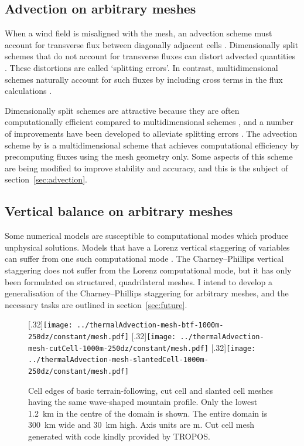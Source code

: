 \documentclass[a4paper,11pt]{article}
\begin{document}
\subsection*{Advection on arbitrary meshes}
When a wind field is misaligned with the mesh, an advection scheme must account for transverse flux between diagonally adjacent cells \citep{clappier1998}.  Dimensionally split schemes that do not account for transverse fluxes can distort advected quantities \citep{leonard1993}.  These distortions are called `splitting errors'.  In contrast, multidimensional schemes naturally account for such fluxes by including cross terms in the flux calculations \citep{leonard1993}.

Dimensionally split schemes are attractive because they are often computationally efficient compared to multidimensional schemes \citep{bott2010}, and a number of improvements have been developed to alleviate splitting errors \citep{leonard1996,bott2010}.  The advection scheme by \citet{weller-shahrokhi2014} is a multidimensional scheme that achieves computational efficiency by precomputing fluxes using the mesh geometry only.  Some aspects of this scheme are being modified to improve stability and accuracy, and this is the subject of section~\ref{sec:advection}.

\subsection*{Vertical balance on arbitrary meshes}
Some numerical models are susceptible to computational modes which produce unphysical solutions.   Models that have a Lorenz vertical staggering of variables can suffer from one such computational mode \citep{arakawa-konor1996}.  The Charney--Phillips vertical staggering does not suffer from the Lorenz computational mode, but it has only been formulated on structured, quadrilateral meshes.  I intend to develop a generalisation of the Charney--Phillips staggering for arbitrary meshes, and the necessary tasks are outlined in section~\ref{sec:future}.

\begin{figure}
	\centering
	[.32\linewidth]{\texttt{[image: ../thermalAdvection-mesh-btf-1000m-250dz/constant/mesh.pdf]}}
	[.32\linewidth]{\texttt{[image: ../thermalAdvection-mesh-cutCell-1000m-250dz/constant/mesh.pdf]}}
	[.32\linewidth]{\texttt{[image: ../thermalAdvection-mesh-slantedCell-1000m-250dz/constant/mesh.pdf]}}
	\caption{Cell edges of basic terrain-following, cut cell and slanted cell meshes having the same wave-shaped mountain profile.  Only the lowest \SI{1.2}{\kilo\meter} in the centre of the domain is shown.  The entire domain is \SI{300}{\kilo\meter} wide and \SI{30}{\kilo\meter} high.  Axis units are \si{\meter}.  Cut cell mesh generated with code kindly provided by TROPOS.}
	\label{fig:meshes}
\end{figure}
\end{document}
